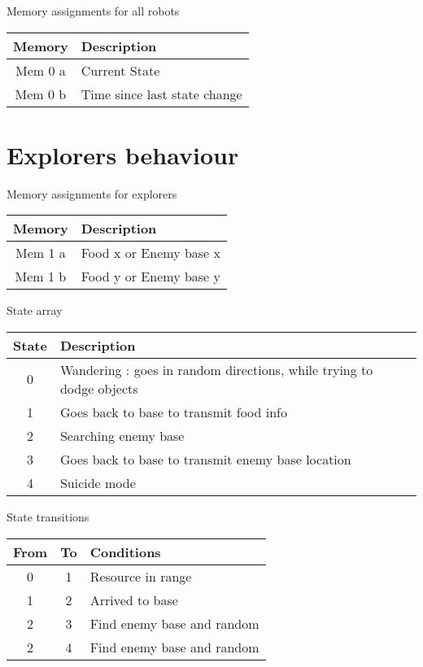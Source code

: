 \documentclass{article}
\begin{document}
\begin{table}[ht]
	Memory assignments for all robots\\
	\begin{tabular}{|c|l|}
		\hline
		Memory & Description\\
		\hline
		Mem 0 a & Current State\\
		Mem 0 b & Time since last state change\\
		\hline
	\end{tabular}
\end{table}

\section{Explorers behaviour}

\begin{table}[ht]
	Memory assignments for explorers\\
	\begin{tabular}{|c|l|}
		\hline
		Memory & Description\\
		\hline
		Mem 1 a & Food x or Enemy base x\\
		Mem 1 b & Food y or Enemy base y\\
		\hline
	\end{tabular}
\end{table}

\begin{table}[ht]
	State array\\
	\begin{tabular}{|c|l|}
		\hline
		State & Description \\
		\hline
		0 & Wandering : goes in random directions, while trying to dodge objects\\
		\hline
		1 & Goes back to base to transmit food info\\
		\hline
		2 & Searching enemy base\\
		\hline
		3 & Goes back to base to transmit enemy base location\\
		\hline
		4 & Suicide mode\\
		\hline
	\end{tabular}
\end{table}

\begin{table}[ht]
	State transitions\\
	\begin{tabular}{|c|c|l|}
		\hline
		From & To & Conditions\\
		\hline
		0 & 1 & Resource in range\\
		\hline
		1 & 2 & Arrived to base\\
		\hline
		2 & 3 & Find enemy base and random\\
		\hline
		2 & 4 & Find enemy base and random\\
		\hline
	\end{tabular}
\end{table}
\end{document}
